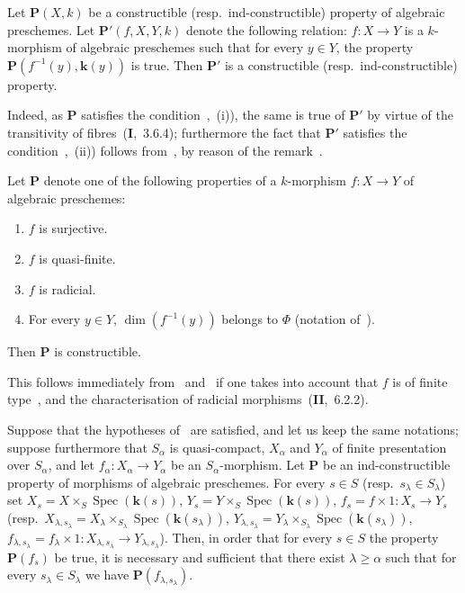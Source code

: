 \begin{proposition}[9.3.1]
\label{IV.9.3.1}
Let $\mathbf{P}(X,k)$ be a constructible \textnormal{(}resp.\ ind-constructible\textnormal{)} property of algebraic preschemes.
Let $\mathbf{P}'(f,X,Y,k)$ denote the following relation: $f:X\to Y$ is a $k$-morphism of algebraic preschemes such that for every $y\in Y$, the property $\mathbf{P}(f^{-1}(y),\mathbf{k}(y))$ is true.
Then $\mathbf{P}'$ is a constructible \textnormal{(}resp.\ ind-constructible\textnormal{)} property.
\end{proposition}

Indeed, as $\mathbf{P}$ satisfies the condition~,~(i)), the same is true of $\mathbf{P}'$ by virtue of the transitivity of fibres~(\textbf{I},~3.6.4); furthermore the fact that $\mathbf{P}'$ satisfies the condition~,~(ii)) follows from~, by reason of the remark~.

\begin{proposition}[9.3.2]
\label{IV.9.3.2}
Let $\mathbf{P}$ denote one of the following properties of a $k$-morphism $f:X\to Y$ of algebraic preschemes:
\begin{enumerate}[label=(\roman*)]
  \item $f$ is surjective.
  \item $f$ is quasi-finite.
  \item $f$ is radicial.
  \item For every $y\in Y$, $\dim(f^{-1}(y))$ belongs to $\Phi$ \textnormal{(}notation of~\textnormal{)}.
\end{enumerate}
Then $\mathbf{P}$ is constructible.
\end{proposition}

This follows immediately from~ and~ if one takes into account that $f$ is of finite type~, and the characterisation of radicial morphisms~(\textbf{II},~6.2.2).

\begin{proposition}[9.3.3]
\label{IV.9.3.3}
Suppose that the hypotheses of~ are satisfied, and let us keep the same notations; suppose furthermore that $S_\alpha$ is quasi-compact, $X_\alpha$ and $Y_\alpha$ of finite presentation over $S_\alpha$, and let $f_\alpha:X_\alpha\to Y_\alpha$ be an $S_\alpha$-morphism.
Let $\mathbf{P}$ be an ind-constructible property of morphisms of algebraic preschemes.
For every $s\in S$ \textnormal{(}resp.\ $s_\lambda\in S_\lambda$\textnormal{)} set $X_s=X\times_S\operatorname{Spec}(\mathbf{k}(s))$, $Y_s=Y\times_S\operatorname{Spec}(\mathbf{k}(s))$, $f_s=f\times 1:X_s\to Y_s$ \textnormal{(}resp.\ $X_{\lambda,s_\lambda}=X_\lambda\times_{S_\lambda}\operatorname{Spec}(\mathbf{k}(s_\lambda))$, $Y_{\lambda,s_\lambda}=Y_\lambda\times_{S_\lambda}\operatorname{Spec}(\mathbf{k}(s_\lambda))$, $f_{\lambda,s_\lambda}=f_\lambda\times 1:X_{\lambda,s_\lambda}\to Y_{\lambda,s_\lambda}$\textnormal{)}.
Then, in order that for every $s\in S$ the property $\mathbf{P}(f_s)$ be true, it is necessary and sufficient that there exist $\lambda\geqslant\alpha$ such that for every $s_\lambda\in S_\lambda$ we have $\mathbf{P}(f_{\lambda,s_\lambda})$.
\end{proposition}


